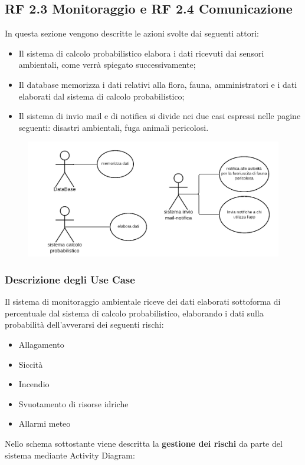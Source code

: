 \subsection*{RF 2.3 Monitoraggio e RF 2.4 Comunicazione}
In questa sezione vengono descritte le azioni svolte dai seguenti attori:
\begin{itemize}
    \item Il sistema di calcolo probabilistico elabora i dati ricevuti dai sensori ambientali, come verrà spiegato successivamente;
    \item Il database memorizza i dati relativi alla flora, fauna, amministratori e i dati elaborati dal sistema di calcolo probabilistico;
    \item Il sistema di invio mail e di notifica si divide nei due casi espressi nelle pagine seguenti: disastri ambientali, fuga animali pericolosi.
\end{itemize}

\begin{figure}[ht]
    \centering
    \includegraphics[scale=0.35]{Img/use_case_2_3_4.png}
\end{figure}

\pagebreak
\subsubsection*{Descrizione degli Use Case}

Il sistema di monitoraggio ambientale riceve dei dati elaborati sottoforma di percentuale dal sistema di calcolo probabilistico, elaborando i dati sulla probabilità dell'avverarsi dei seguenti rischi:
\begin{itemize}
    \item Allagamento
    \item Siccità
    \item Incendio 
    \item Svuotamento di risorse idriche
    \item Allarmi meteo
\end{itemize}
Nello schema sottostante viene descritta la \textbf{gestione dei rischi} da parte del sistema mediante Activity Diagram:

